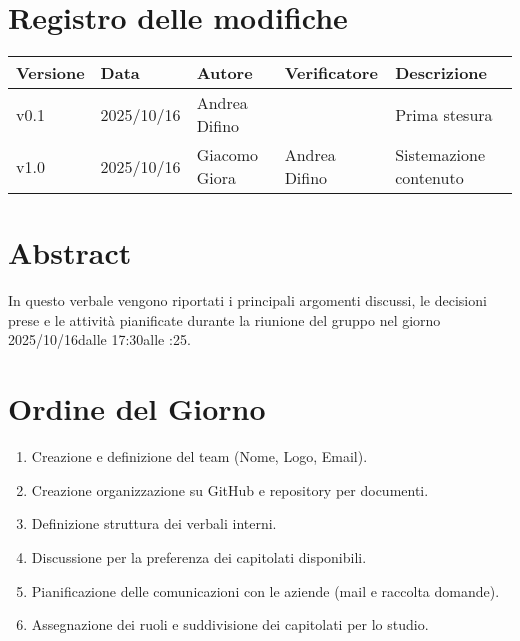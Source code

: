 \documentclass[a4paper,12pt]{article}
\newcommand{\DataVerbale}{2025/10/16}
\newcommand{\OraInizio}{17:30}
\newcommand{\OraFine}{19:25}
\newcommand{\AbstractVerbale}{%
In questo verbale vengono riportati i principali argomenti discussi, le decisioni prese e le attività pianificate durante la riunione del gruppo nel giorno \DataVerbale \space dalle \OraInizio \space alle \space \OraFine .
}
\newcommand{\VersioneVerbale}{v1.0} %
\begin{document}
\section*{Registro delle modifiche}{
    \begin{center} 
        \begin{tabular}{|l|l|l|l|l|}
            \hline
            \textbf{Versione} & \textbf{Data} & \textbf{Autore} & \textbf{Verificatore} & \textbf{Descrizione} \\
            \hline
            v0.1 & \DataVerbale & Andrea Difino & & Prima stesura\\
            \hline
            \VersioneVerbale & \DataVerbale & Giacomo Giora & Andrea Difino & Sistemazione contenuto\\
            \hline
        \end{tabular}
    \end{center}
}

\newpage

\tableofcontents

\newpage
\section{Abstract}{
    \begin{minipage}{0.9\textwidth}
        \small
        \AbstractVerbale
    \end{minipage}
}


\section{Ordine del Giorno}{
    \begin{enumerate}
        \item Creazione e definizione del team (Nome, Logo, Email).
        \item Creazione organizzazione su GitHub e repository per documenti.
        \item Definizione struttura dei verbali interni.
        \item Discussione per la preferenza dei capitolati disponibili.
        \item Pianificazione delle comunicazioni con le aziende (mail e raccolta domande).
        \item Assegnazione dei ruoli e suddivisione dei capitolati per lo studio.
    \end{enumerate}
}
\end{document}
